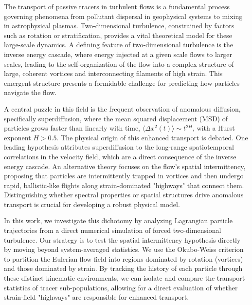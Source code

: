\documentclass[]{article}
\begin{document}
The transport of passive tracers in turbulent flows is a fundamental process governing phenomena from pollutant dispersal in geophysical systems to mixing in astrophysical plasmas. Two-dimensional turbulence, constrained by factors such as rotation or stratification, provides a vital theoretical model for these large-scale dynamics. A defining feature of two-dimensional turbulence is the inverse energy cascade, where energy injected at a given scale flows to larger scales, leading to the self-organization of the flow into a complex structure of large, coherent vortices and interconnecting filaments of high strain. This emergent structure presents a formidable challenge for predicting how particles navigate the flow.

A central puzzle in this field is the frequent observation of anomalous diffusion, specifically superdiffusion, where the mean squared displacement (MSD) of particles grows faster than linearly with time, $\langle \Delta x^2(t) \rangle \sim t^{2H}$, with a Hurst exponent $H > 0.5$. The physical origin of this enhanced transport is debated. One leading hypothesis attributes superdiffusion to the long-range spatiotemporal correlations in the velocity field, which are a direct consequence of the inverse energy cascade. An alternative theory focuses on the flow's spatial intermittency, proposing that particles are intermittently trapped in vortices and then undergo rapid, ballistic-like flights along strain-dominated "highways" that connect them. Distinguishing whether spectral properties or spatial structures drive anomalous transport is crucial for developing a robust physical model.

In this work, we investigate this dichotomy by analyzing Lagrangian particle trajectories from a direct numerical simulation of forced two-dimensional turbulence. Our strategy is to test the spatial intermittency hypothesis directly by moving beyond system-averaged statistics. We use the Okubo-Weiss criterion to partition the Eulerian flow field into regions dominated by rotation (vortices) and those dominated by strain. By tracking the history of each particle through these distinct kinematic environments, we can isolate and compare the transport statistics of tracer sub-populations, allowing for a direct evaluation of whether strain-field "highways" are responsible for enhanced transport.
\end{document}
